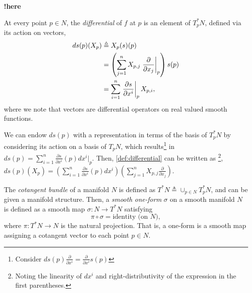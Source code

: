 \documentclass[psamsfonts]{amsart}
\theoremstyle{definition}
\theoremstyle{remark}
\newcommand*\isdefined{\triangleq}
\newcommand{\fracpartial}[2]{\frac{\partial #1}{\partial  #2}}
\numberwithin{equation}{section}
\begin{document}
{\color{magenta}\textbf{!here}\\}
{\color{red}



 

 At every point $p \in N$, the \textit{differential} of $f$ at $p$ is an element of $T^*_pN$, defined via its action on vectors, 
\begin{align}
    ds(p)(X_p) & \isdefined X_p(s)(p) \label{def:differential} \\%
     & = \left(\sum_{j = 1}^nX_{p, j}\left.\frac{\partial}{\partial x_j}\right\rvert_p\right)s(p) \notag \\
     & = \sum_{i = 1}^n \left.\frac{\partial s}{\partial x^i} \right\rvert_p X_{p, i}, \notag
\end{align}
where we note that vectors are differential operators on real valued smooth functions. 

We can endow $ds(p)$ with a representation in terms of the basis of $T^*_pN$ by considering its action on a basis of $T_pN$, which results\footnote{{\color{red}Consider $ds(p)\fracpartial{ }{x^i} = \fracpartial{}{x^i}s(p)$ }} in $ds(p) =\sum_{i = 1}^n \frac{\partial s}{\partial x^i}(p)dx^i\vert_p$. Then, \eqref{def:differential} can be written as \footnote{Noting the linearity of $dx^i$ and right-distributivity of the expression in the first parentheses.}, $ds(p)(X_p) = \left(\sum_{i = 1}^n \frac{\partial s}{\partial x^i}(p)dx^i  \right)\left(\sum_{j = 1}^nX_{p, j}\frac{\partial}{\partial x_j}\right)$. 

The \textit{cotangent bundle} of a manifold $N$ is defined as $T^*N \isdefined \cup_{p\in N}T_p^*N$, and can be given a manifold structure. Then, a \textit{smooth one-form} $\sigma$ on a smooth manifold $N$ is defined as a smooth map $\sigma : N \rightarrow T^*N$ satisfying $$\pi \circ \sigma = \text{identity (on } N),$$ where $\pi: T^*N \rightarrow N$ is the natural projection. That is, a one-form is a smooth map assigning a cotangent vector to each point $p\in N$.

}
\end{document}
